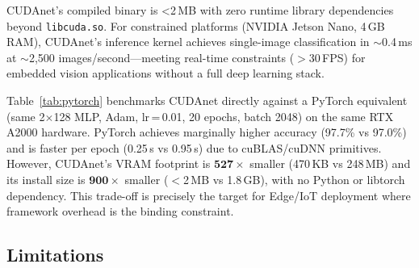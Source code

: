 \documentclass[conference]{IEEEtran}
\begin{document}
CUDAnet's compiled binary is \textless 2\,MB with zero runtime library dependencies beyond \texttt{libcuda.so}. For constrained platforms (NVIDIA Jetson Nano, 4\,GB RAM), CUDAnet's inference kernel achieves single-image classification in $\sim$0.4\,ms at $\sim$2,500 images/second—meeting real-time constraints ($>$30\,FPS) for embedded vision applications without a full deep learning stack.

Table~\ref{tab:pytorch} benchmarks CUDAnet directly against a PyTorch equivalent (same 2$\times$128 MLP, Adam, lr\,=\,0.01, 20 epochs, batch 2048) on the same RTX A2000 hardware. PyTorch achieves marginally higher accuracy (97.7\% vs 97.0\%) and is faster per epoch (0.25\,s vs 0.95\,s) due to cuBLAS/cuDNN primitives. However, CUDAnet's VRAM footprint is $\mathbf{527\times}$ smaller (470\,KB vs 248\,MB) and its install size is $\mathbf{900\times}$ smaller ($<$2\,MB vs 1.8\,GB), with no Python or libtorch dependency. This trade-off is precisely the target for Edge/IoT deployment where framework overhead is the binding constraint.

\begin{table}[htbp]
\caption{CUDAnet vs.\ PyTorch — Same 2$\times$128 Adam MLP on RTX A2000}
\begin{center}
\label{tab:pytorch}
\end{center}
\end{table}

\subsection{Limitations}
\end{document}

